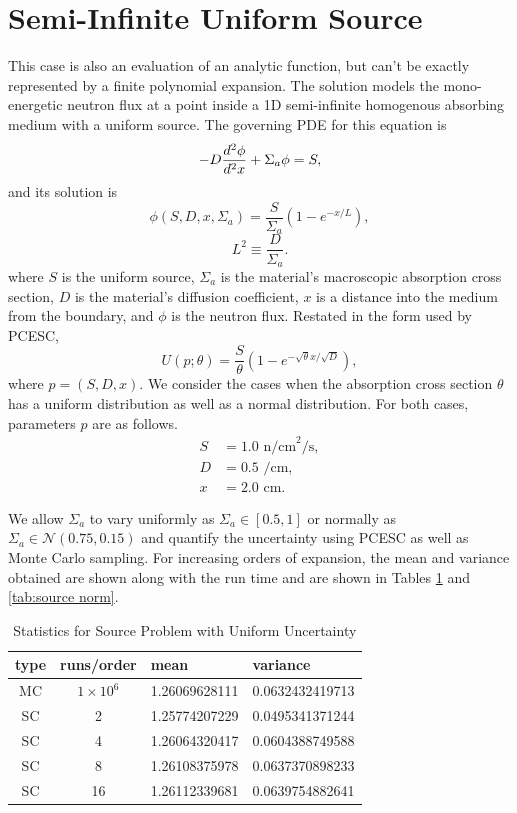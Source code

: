 \section{Semi-Infinite Uniform Source}
This case is also an evaluation of an analytic function, but can't be exactly represented by a finite polynomial expansion.  The solution models the mono-energetic neutron flux at a point inside a 1D semi-infinite homogenous absorbing medium with a uniform source.  The governing PDE for this equation is
\begin{equation}
-D\frac{d^2 \phi}{d^2 x}+\Sigma_a\phi = S,
\end{equation}
and its solution is
\begin{equation}
\phi(S,D,x,\Sigma_a)=\frac{S}{\Sigma_a}\left(1-e^{-x/L}\right),
\end{equation}
\begin{equation}
L^2\equiv \frac{D}{\Sigma_a}.
\end{equation}
where $S$ is the uniform source, $\Sigma_a$ is the material's macroscopic absorption cross section, $D$ is the material's diffusion coefficient, $x$ is a distance into the medium from the boundary, and $\phi$ is the neutron flux.  Restated in the form used by PCESC,
\begin{equation}
U(p;\theta) = \frac{S}{\theta}\left(1-e^{-\sqrt{\theta} x/\sqrt{D}}\right),
\end{equation}
where $p=(S,D,x)$.  
We consider the cases when the absorption cross section $\theta$ has a uniform distribution as well as a normal distribution.   For both cases, parameters $p$ are as follows.
\begin{align}
S &= 1.0 \text{ n/cm}^2\text{/s},\\
D &= 0.5 \text{ /cm},\\
x &= 2.0 \text{ cm}.
\end{align}

We allow $\Sigma_a$ to vary uniformly as $\Sigma_a\in[0.5,1]$ or normally as $\Sigma_a\in\mathcal{N}(0.75,0.15)$ and quantify the uncertainty using PCESC as well as Monte Carlo sampling.
For increasing orders of expansion, the mean and variance obtained are shown along with the run time and are shown in Tables \ref{tab:source uni} and \ref{tab:source norm}.
\begin{table}
\begin{center}
\begin{tabular}{c c|l l}
type & runs/order & mean & variance \\ \hline
MC & $1\times10^6$ & 1.26069628111 & 0.0632432419713\\
SC & 2 & 1.25774207229 & 0.0495341371244 \\
SC & 4 & 1.26064320417 & 0.0604388749588 \\
SC & 8 & 1.26108375978 & 0.0637370898233\\
SC & 16 & 1.26112339681 & 0.0639754882641
\end{tabular}
\end{center}
\caption{Statistics for Source Problem with Uniform Uncertainty}
\label{tab:source uni}
\end{table}

